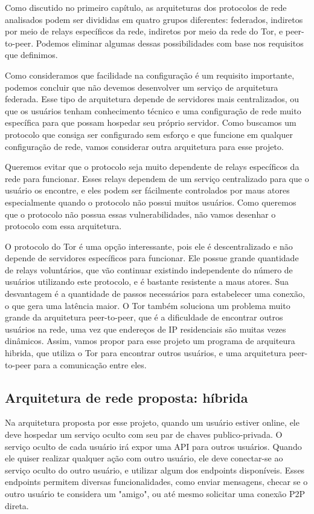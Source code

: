 Como discutido no primeiro capítulo, as arquiteturas dos protocolos de rede analisados podem ser divididas em quatro grupos diferentes: federados, indiretos por meio de relays específicos da rede, indiretos por meio da rede do Tor, e peer-to-peer. Podemos eliminar algumas dessas possibilidades com base nos requisitos que definimos.

Como consideramos que facilidade na configuração é um requisito importante, podemos concluir que não devemos desenvolver um serviço de arquitetura federada. Esse tipo de arquitetura depende de servidores mais centralizados, ou que os usuários tenham conhecimento técnico e uma configuração de rede muito específica para que possam hospedar seu próprio servidor. Como buscamos um protocolo que consiga ser configurado sem esforço e que funcione em qualquer configuração de rede, vamos considerar outra arquitetura para esse projeto.

Queremos evitar que o protocolo seja muito dependente de relays específicos da rede para funcionar. Esses relays dependem de um serviço centralizado para que o usuário os encontre, e eles podem ser fácilmente controlados por maus atores especialmente quando o protocolo não possui muitos usuários. Como queremos que o protocolo não possua essas vulnerabilidades, não vamos desenhar o protocolo com essa arquitetura.

O protocolo do Tor é uma opção interessante, pois ele é descentralizado e não depende de servidores específicos para funcionar. Ele possue grande quantidade de relays voluntários, que vão continuar existindo independente do número de usuários utilizando este protocolo, e é bastante resistente a maus atores. Sua desvantagem é a quantidade de passos necessários para estabelecer uma conexão, o que gera uma latência maior. O Tor também soluciona um problema muito grande da arquitetura peer-to-peer, que é a dificuldade de encontrar outros usuários na rede, uma vez que endereços de IP residenciais são muitas vezes dinâmicos. Assim, vamos propor para esse projeto um programa de arquiteura hibrida, que utiliza o Tor para encontrar outros usuários, e uma arquitetura peer-to-peer para a comunicação entre eles.

\subsection{Arquitetura de rede proposta: híbrida}

Na arquitetura proposta por esse projeto, quando um usuário estiver online, ele deve hospedar um serviço oculto com seu par de chaves publico-privada. O serviço oculto de cada usuário irá expor uma API para outros usuários. Quando ele quiser realizar qualquer ação com outro usuário, ele deve conectar-se ao serviço oculto do outro usuário, e utilizar algum dos endpoints disponíveis. Esses endpoints permitem diversas funcionalidades, como enviar mensagens, checar se o outro usuário te considera um "amigo", ou até mesmo solicitar uma conexão P2P direta.

